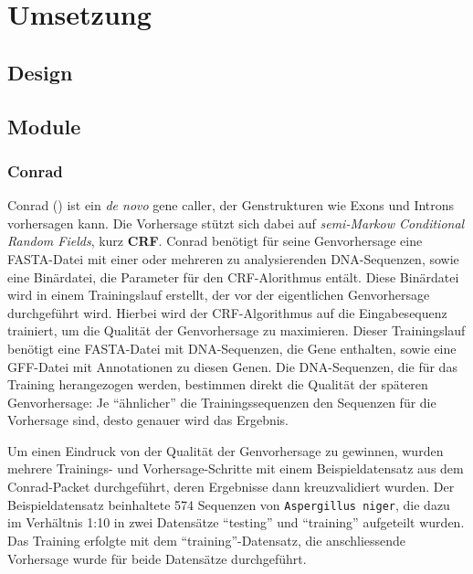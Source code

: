 \chapter{Umsetzung}
\section{Design}
\section{Module}
\subsection{Conrad}
Conrad
()
ist ein \textit{de novo} gene caller, der Genstrukturen wie Exons und Introns
vorhersagen kann.
 
Die Vorhersage stützt sich dabei auf \textit{semi-Markow Conditional Random
Fields}, kurz \textbf{CRF}.  %
  
Conrad benötigt für seine Genvorhersage eine FASTA-Datei mit einer oder
mehreren zu analysierenden DNA-Sequenzen, sowie eine Binärdatei, die Parameter
für den CRF-Alorithmus entält.
Diese Binärdatei wird in einem Trainingslauf erstellt, der vor der
eigentlichen Genvorhersage durchgeführt wird. Hierbei wird der CRF-Algorithmus
auf die Eingabesequenz trainiert, um die Qualität der Genvorhersage
zu maximieren. Dieser Trainingslauf benötigt eine FASTA-Datei mit
DNA-Sequenzen, die Gene enthalten, sowie eine GFF-Datei mit Annotationen zu
diesen Genen.
Die DNA-Sequenzen, die für das Training herangezogen werden, bestimmen direkt
die Qualität der späteren Genvorhersage:
Je \enquote{ähnlicher} die Trainingssequenzen den Sequenzen für die
Vorhersage sind, desto genauer wird das Ergebnis.
\citep{doherty_gene_2007}

Um einen Eindruck von der Qualität der Genvorhersage zu gewinnen, wurden
mehrere Trainings- und Vorhersage-Schritte mit einem Beispieldatensatz aus dem
Conrad-Packet durchgeführt, deren Ergebnisse dann kreuzvalidiert wurden.
Der Beispieldatensatz beinhaltete 574 Sequenzen von \texttt{Aspergillus niger},
die dazu im Verhältnis 1:10 in zwei Datensätze \enquote{testing} und
\enquote{training} aufgeteilt wurden. Das Training erfolgte mit dem
\enquote{training}-Datensatz, die anschliessende Vorhersage wurde für beide
Datensätze durchgeführt.

